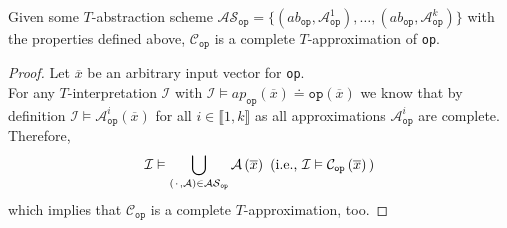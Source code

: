 \begin{lemma}
    \label{lemma:refinement_approach:abstraction_scheme:as_completeness}
Given some $T$-abstraction scheme 
$\mathcal{AS}_{\texttt{op}} = \{ \left(ab_{\texttt{op}}, \mathcal{A}^1_{\texttt{op}}\right),\dots,\left(ab_{\texttt{op}}, \mathcal{A}^k_{\texttt{op}}\right) \}$
with the properties defined above,
$\mathcal{C}_{\texttt{op}}$ is a complete $T$-approximation of \texttt{op}.
\begin{proof}
Let $\overline{x}$ be an arbitrary input vector for \texttt{op}.\\
For any $T$-interpretation $\mathcal{I}$ with $\mathcal{I} \vDash ap_{\texttt{op}}\left(\overline{x}\right) \doteq \texttt{op}\left(\overline{x}\right)$ we know that by definition $\mathcal{I} \vDash \mathcal{A}^i_{\texttt{op}}\left(\overline{x}\right)$ for all $i\in\llbracket1,k\rrbracket$ as all approximations $\mathcal{A}^i_{\texttt{op}}$ are complete.\\
Therefore,
\[
    \mathcal{I} \vDash \bigcup\limits_{\left({\mkern 2mu\cdot\mkern 2mu},\mathcal{A}\right)\in\mathcal{AS}_{\texttt{op}}} \mathcal{A}\left(\overline{x}\right)
    \text{ (i.e., }\mathcal{I} \vDash \mathcal{C}_{\texttt{op}}\left(\overline{x}\right)\text{)}
\]
which implies that $\mathcal{C}_{\texttt{op}}$ is a complete $T$-approximation, too.
\end{proof}
\end{lemma}

